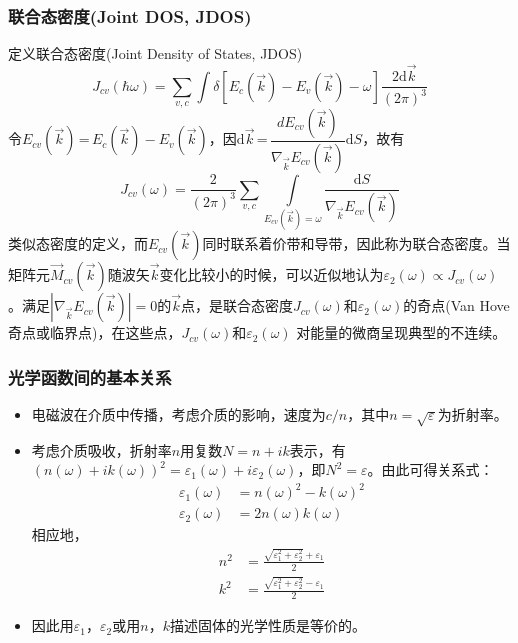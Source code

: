 \frame
{
\frametitle{联合态密度(Joint DOS, JDOS)}
定义联合态密度(\textrm{Joint Density of States, JDOS})
\begin{displaymath}
  J_{cv}(\hbar\omega)=\sum_{v,c}\int\delta[E_c(\vec k)-E_v(\vec k)-\omega]\frac{2\textrm{d}\vec k}{(2\pi)^3}
  \label{eq:optic-33}
\end{displaymath}
\footnotesize{令$E_{cv}(\vec k)$\,=\,$E_c(\vec k)-E_v(\vec k)$，因$\textrm{d}\vec k$\,=\,$\dfrac{dE_{cv}(\vec k)}{\nabla_{\vec k}E_{cv}(\vec k)}\textrm{d}S$，故有
\begin{displaymath}
  J_{cv}(\omega)=\frac2{(2\pi)^3}\sum_{v,c}\int\limits_{E_{cv}(\vec k)=\omega}\frac{\textrm{d}S}{\nabla_{\vec k}E_{cv}(\vec k)}
  \label{eq:optic-34}
\end{displaymath}
类似态密度的定义，而$E_{cv}(\vec k)$同时联系着价带和导带，因此称为联合态密度。当矩阵元$\vec M_{cv}(\vec k)$随波矢$\vec k$变化比较小的时候，可以近似地认为$\varepsilon_2(\omega)\!\propto\!J_{cv}(\omega)$。满足$|\nabla_{\vec k}E_{cv}(\vec k)|\!=\!0$的$\vec k$点，是联合态密度$J_{cv}(\omega)$和$\varepsilon_2(\omega)$的奇点(\textrm{Van Hove}奇点或临界点)，在这些点，$J_{cv}(\omega)$和$\varepsilon_2(\omega)$%
对能量的微商呈现典型的不连续。%
}}

\frame
{
\frametitle{光学函数间的基本关系}
\begin{itemize}
	\item 电磁波在介质中传播，考虑介质的影响，速度为$c/n$，其中$n=\sqrt\varepsilon$为折射率。%
	\item 考虑介质吸收，折射率$n$用复数$N=n+ik$表示，有$(n(\omega)+ik(\omega))^2=\varepsilon_1(\omega)+i\varepsilon_2(\omega)$，即$N^2=\varepsilon$。由此可得关系式：
\begin{displaymath}
\begin{aligned}
   \varepsilon_1(\omega)&=n(\omega)^2-k(\omega)^2\\
   \varepsilon_2(\omega)&=2n(\omega)k(\omega)
 \end{aligned}%
  \label{eq:optic-9}
\end{displaymath}
相应地，
\begin{displaymath}
\begin{aligned}
   n^2&=\frac{\sqrt{\varepsilon_1^2+\varepsilon_2^2}+\varepsilon_1}2\\
   k^2&=\frac{\sqrt{\varepsilon_1^2+\varepsilon_2^2}-\varepsilon_1}2
   \end{aligned}%
  \label{eq:optic-10}
\end{displaymath}
	\item 因此用$\varepsilon_1$，$\varepsilon_2$或用$n$，$k$描述固体的光学性质是等价的。
\end{itemize}
}

